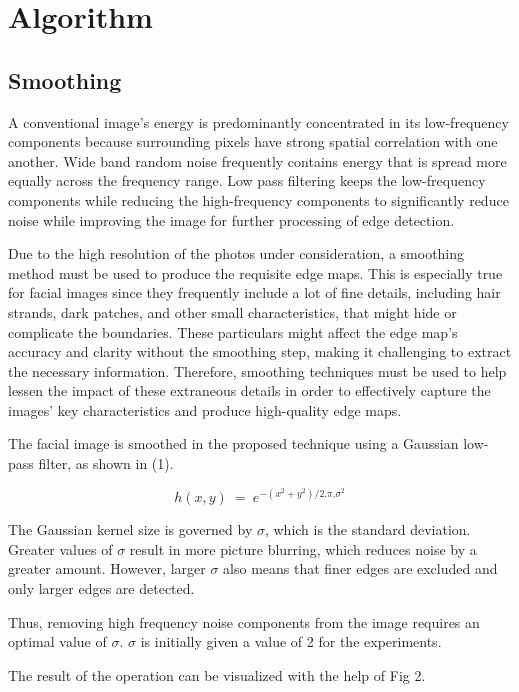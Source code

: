 \documentclass{70_styles/svproc}
\begin{document}
\section{Algorithm}

\subsection{Smoothing}

A conventional image's energy is predominantly concentrated in its low-frequency components because surrounding pixels have strong spatial correlation with one another. Wide band random noise frequently contains energy that is spread more equally across the frequency range. Low pass filtering keeps the low-frequency components while reducing the high-frequency components to significantly reduce noise while improving the image for further processing of edge detection.

Due to the high resolution of the photos under consideration, a smoothing method must be used to produce the requisite edge maps. This is especially true for facial images since they frequently include a lot of fine details, including hair strands, dark patches, and other small characteristics, that might hide or complicate the boundaries. These particulars might affect the edge map's accuracy and clarity without the smoothing step, making it challenging to extract the necessary information. Therefore, smoothing techniques must be used to help lessen the impact of these extraneous details in order to effectively capture the images' key characteristics and produce high-quality edge maps.

The facial image is smoothed in the proposed technique using a Gaussian low-pass filter, as shown in (1). 

\begin{equation}
    h(x,y)\ =\ e^{-(x^2 + y^2)/2.\pi.\sigma^2}
\end{equation}

The Gaussian kernel size is governed by $\sigma$, which is the standard deviation. Greater values of $\sigma$ result in more picture blurring, which reduces noise by a greater amount. However, larger $\sigma$ also means that finer edges are excluded and only larger edges are detected.

Thus, removing high frequency noise components from the image requires an optimal value of $\sigma$. $\sigma$ is initially given a value of 2 for the experiments.

The result of the operation can be visualized with the help of Fig 2.
\end{document}
